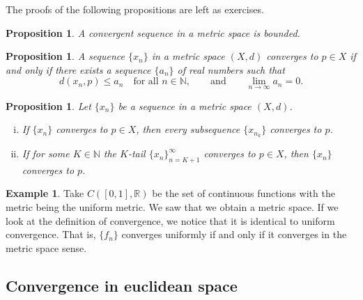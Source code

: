 \documentclass[12pt,openany]{book}
\newcommand{\R}{{\mathbb{R}}}
\newcommand{\N}{{\mathbb{N}}}
\theoremstyle{plain}
\newtheorem{prop}[thm]{Proposition}
\theoremstyle{remark}
\newtheorem{remark}[thm]{Remark}
\theoremstyle{definition}
\theoremstyle{exercise}
\theoremstyle{example}
\newtheorem{example}[thm]{Example}
\begin{document}
The proofs of the following propositions are left as exercises.

\begin{prop} \label{prop:msconvbound}
A convergent sequence in a metric space is bounded.
\end{prop}

\begin{prop} \label{prop:msconvifa}
A sequence $\{ x_n \}$ in a metric space $(X,d)$ converges to $p \in X$
if and only
if there exists a sequence $\{ a_n \}$ of real numbers such that
\begin{equation*}
d(x_n,p) \leq a_n \quad \text{for all $n \in \N$},
\qquad \text{and} \qquad
\lim_{n\to\infty} a_n = 0.
\end{equation*}
\end{prop}

\begin{prop} \label{prop:mssubseq}
Let $\{ x_n \}$ be a sequence in a metric space $(X,d)$.
\begin{enumerate}[(i)]
\item If $\{ x_n \}$ converges to $p \in X$, then every subsequence $\{ x_{n_k} \}$
converges to $p$.
\item If for some $K \in \N$ the $K$-tail $\{ x_n \}_{n=K+1}^\infty$
converges to $p \in X$, then
 $\{ x_n \}$ converges to $p$.
\end{enumerate}
\end{prop}

\begin{example}
Take $C([0,1],\R)$ be the set of continuous functions with the metric being
the uniform metric.  We saw that we obtain a metric space.
If we look at the definition of convergence, we notice that it is identical
to uniform convergence.  That is, $\{ f_n \}$ converges uniformly if and only
if it converges in the metric space sense.
\end{example}


\subsection{Convergence in euclidean space}
\end{document}
